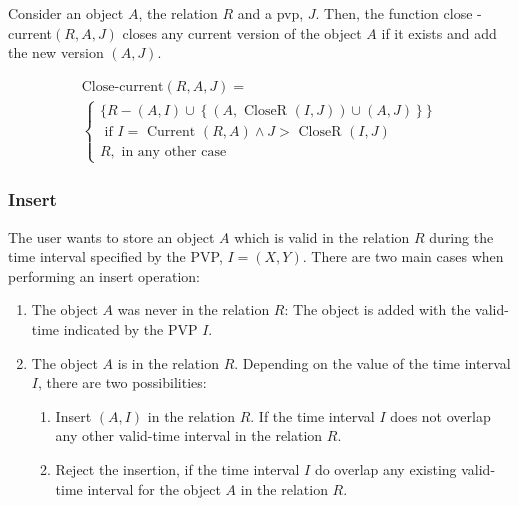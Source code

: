 \begin{definition}
\label{def:pvp-close-current-version}
Consider an object $A$, the relation $R$ and a pvp, $J$. Then, the function close - current$\left(R, A, J \right)$ closes any current version of the object $A$ if it exists and add the new version $\left(A, J \right)$.

\begin{eqnarray}
\label{eq:pvp-close-current}
\text{Close-current} \left(R, A, J \right) =\\
\begin{cases}
\nonumber
\big \lbrace R - \left(A, I \right) \cup \left \lbrace \left(A, \mbox{ CloseR } \left(I, J\right) \right) \cup \left(A, J\right)\right \rbrace  \big \rbrace \\
\nonumber
\mbox{ if } I = \mbox{ Current } \left(R, A \right) \wedge J > \mbox{ CloseR } \left(I, J \right)   \\
\nonumber R , \text{ in any other case}
\end{cases}
\end{eqnarray}
\end{definition}

\subsubsection{\label{subsubsec:insert-fuzzy-temporal}Insert}
The user wants to store an object $A$ which is valid in the relation $R$ during the time interval specified by the PVP, $I = \left(X, Y \right)$.
%
%
There are two main cases when performing an insert operation:
\begin{enumerate}
\item The object $A$ was never in the relation $R$: The object is added with the valid-time indicated by the PVP $I$.

\item The object $A$ is in the relation $R$. Depending on the value of the time interval $I$, there are two possibilities:
	\begin{enumerate}
	\item Insert $\left(A, I\right)$ in the relation $R$. If the time interval $I$ does not overlap any other valid-time interval in the relation $R$.
	\item Reject the insertion, if the time interval $I$ do overlap any existing valid-time interval for the object $A$ in the relation $R$.
	\end{enumerate}

\end{enumerate}

